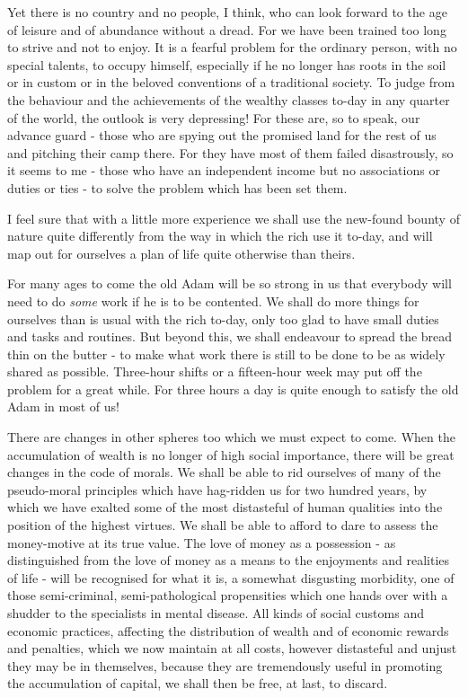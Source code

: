 Yet there is no country and no people, I think, who can look forward to the age of leisure and of abundance without a dread. For we have been trained too long to strive and not to enjoy. It is a fearful problem for the ordinary person, with no special talents, to occupy himself, especially if he no longer has roots in the soil or in custom or in the beloved conventions of a traditional society. To judge from the behaviour and the achievements of the wealthy classes to-day in any quarter of the world, the outlook is very depressing! For these are, so to speak, our advance guard - those who are spying out the promised land for the rest of us and pitching their camp there. For they have most of them failed disastrously, so it seems to me - those who have an independent income but no associations or duties or ties - to solve the problem which has been set them.\par

I feel sure that with a little more experience we shall use the new-found bounty of nature quite differently from the way in which the rich use it to-day, and will map out for ourselves a plan of life quite otherwise than theirs.\par

For many ages to come the old Adam will be so strong in us that everybody will need to do \textit{some} work if he is to be contented. We shall do more things for ourselves than is usual with the rich to-day, only too glad to have small duties and tasks and routines. But beyond this, we shall endeavour to spread the bread thin on the butter - to make what work there is still to be done to be as widely shared as possible. Three-hour shifts or a fifteen-hour week may put off the problem for a great while. For three hours a day is quite enough to satisfy the old Adam in most of us!\par

There are changes in other spheres too which we must expect to come. When the accumulation of wealth is no longer of high social importance, there will be great changes in the code of morals. We shall be able to rid ourselves of many of the pseudo-moral principles which have hag-ridden us for two hundred years, by which we have exalted some of the most distasteful of human qualities into the position of the highest virtues. We shall be able to afford to dare to assess the money-motive at its true value. The love of money as a possession - as distinguished from the love of money as a means to the enjoyments and realities of life - will be recognised for what it is, a somewhat disgusting morbidity, one of those semi-criminal, semi-pathological propensities which one hands over with a shudder to the specialists in mental disease. All kinds of social customs and economic practices, affecting the distribution of wealth and of economic rewards and penalties, which we now maintain at all costs, however distasteful and unjust they may be in themselves, because they are tremendously useful in promoting the accumulation of capital, we shall then be free, at last, to discard.\par

